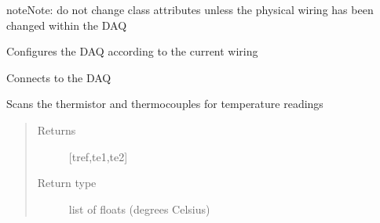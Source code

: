 \documentclass[letterpaper,10pt,english]{sphinxmanual}
\begin{document}
\begin{fulllineitems}
\begin{sphinxadmonition}{note}{Note:}
do not change class attributes unless the physical wiring has been changed within the DAQ
\end{sphinxadmonition}

\begin{fulllineitems}
\label{\detokenize{source/laboratory.drivers:laboratory.drivers.daq.DAQ.configure}}
Configures the DAQ according to the current wiring

\end{fulllineitems}


\begin{fulllineitems}
\label{\detokenize{source/laboratory.drivers:laboratory.drivers.daq.DAQ.connect}}
Connects to the DAQ

\end{fulllineitems}


\begin{fulllineitems}
\label{\detokenize{source/laboratory.drivers:laboratory.drivers.daq.DAQ.get_temp}}
Scans the thermistor and thermocouples for temperature readings
\begin{quote}\begin{description}
\item[{Returns}] \leavevmode
{[}tref,te1,te2{]}

\item[{Return type}] \leavevmode
list of floats (degrees Celsius)

\end{description}\end{quote}

\end{fulllineitems}



\end{fulllineitems}
\end{document}

